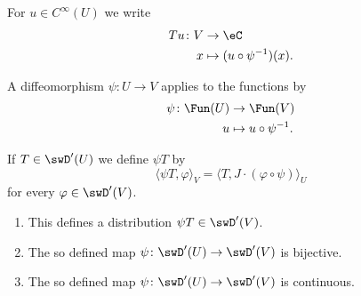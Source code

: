 For \( u\in  C^{\infty}(U)\) we write
\begin{equation}        \label{EQooHSVBooIZRxzh}
    \begin{aligned}
        Tu\colon V&\to \eC \\
        x&\mapsto (u\circ \psi^{-1})(x). 
    \end{aligned}
\end{equation}

A diffeomorphism \( \psi\colon U\to V\) applies to the functions by
\begin{equation}        \label{EQooMZSEooATfSTR}
    \begin{aligned}
        \psi\colon \Fun(U)&\to \Fun(V) \\
        u&\mapsto u\circ\psi^{-1}. 
    \end{aligned}
\end{equation}

\begin{propositionDef}      \label{PROPooXAOKooQSBKHg}
If \( T\in \swD'(U)\) we define \( \psi T\) by
\begin{equation}
    \langle \psi T, \varphi\rangle_V=\langle T, J\cdot(\varphi\circ \psi)\rangle_U
\end{equation}
for every \( \varphi\in\swD'(V)\). 

\begin{enumerate}
    \item       \label{ITEMooXHELooYhXNRs}
        This defines a distribution \( \psi T\in \swD'(V)\).
    \item       \label{ITEMooGDCYooVDFpuy}
        The so defined map \( \psi\colon \swD'(U)\to \swD'(V)\) is bijective.
    \item       \label{ITEMooNGSJooEdRgHt}
        The so defined map \( \psi\colon \swD'(U)\to \swD'(V)\) is continuous.
\end{enumerate}

\end{propositionDef}

